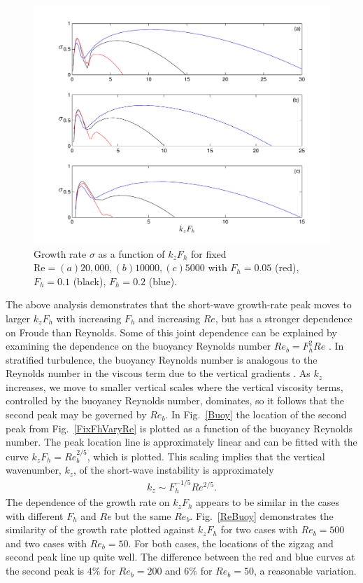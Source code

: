 \begin{figure}
\begin{center}
\includegraphics[width=\textwidth]{fixed_reynolds_varying_froude}
\caption{Growth rate $\sigma$ as a function of $k_{z}F_{h}$ for fixed $\text{Re}=(a) 20{,}000, (b) 10000, (c) 5000$ with $F_{h}=0.05$ (red), $F_{h}=0.1$ (black), $F_{h}=0.2$ (blue).}
\label{FixReVaryFh}
\end{center}
\end{figure}
The above analysis demonstrates that the short-wave growth-rate peak moves to larger $k_{z}F_{h}$ with increasing $F_{h}$ and increasing $Re$, but has a stronger dependence on Froude than Reynolds. Some of this joint dependence can be explained by examining the dependence on the buoyancy Reynolds number $Re_{b}=F_{h}^{2}Re$ \cite{riley2003,hebert2006,brethouwer2007}. In stratified turbulence, the buoyancy Reynolds number is analogous to the Reynolds number in the viscous term due to the vertical gradients \cite{brethouwer2007}. As $k_{z}$ increases, we move to smaller vertical scales where the vertical viscosity terms, controlled by the buoyancy Reynolds number, dominates, so it follows that the second peak may be governed by $Re_{b}$. In Fig.~\ref{Buoy} the location of the second peak from Fig.~\ref{FixFhVaryRe} is plotted as a function of the buoyancy Reynolds number. The peak location line is approximately linear and can be fitted with the curve $k_{z}F_{h}= Re_{b}^{2/5}$, which is plotted. This scaling implies that the vertical wavenumber, $k_{z}$, of the short-wave instability is approximately 
\begin{align}
k_{z} \sim F_{h}^{-1/5} Re^{2/5}\label{buoyscale}.
\end{align} 
The dependence of the growth rate on $k_{z}F_{h}$ appears to be similar in the cases with different $F_{h}$ and $Re$ but the same $Re_{b}$. Fig.~\ref{ReBuoy} demonstrates the similarity of the growth rate plotted against $k_{z}F_{h}$ for two cases with $Re_{b}=500$ and two cases with $Re_{b}=50$. For both cases, the locations of the zigzag and second peak line up quite well. The difference between the red and blue curves at the second peak is $4\%$ for $Re_{b}=200$ and $6\%$ for $Re_{b}=50$, a reasonable variation. 

